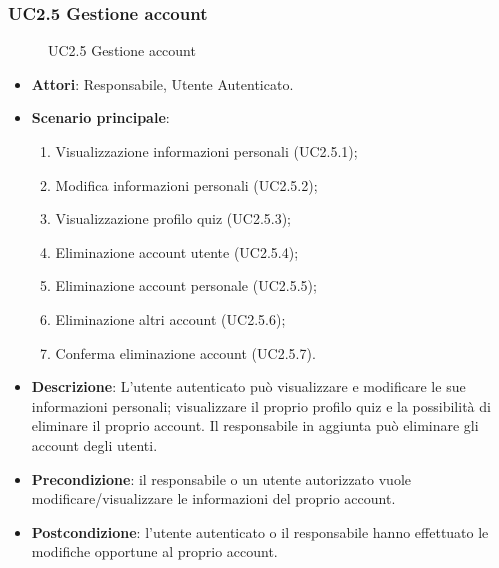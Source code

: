 \subsubsection{UC2.5 Gestione account}
\begin{figure}[H]
\centering
\noindent{}
\caption{UC2.5 Gestione account}
\end{figure}
\begin{itemize}
\item \textbf{Attori}: Responsabile, Utente Autenticato.
\item \textbf{Scenario principale}:
\begin{enumerate}
\item Visualizzazione informazioni personali (UC2.5.1);
\item Modifica informazioni personali (UC2.5.2);
\item Visualizzazione profilo quiz (UC2.5.3);
\item Eliminazione account utente (UC2.5.4);
\item Eliminazione account personale (UC2.5.5);
\item Eliminazione altri account (UC2.5.6);
\item Conferma eliminazione account (UC2.5.7).
\end{enumerate}
\item \textbf{Descrizione}: L'utente autenticato può visualizzare e modificare le sue informazioni personali; visualizzare il proprio profilo quiz e la possibilità di eliminare il proprio account. Il responsabile in aggiunta può eliminare gli account degli utenti.
\item \textbf{Precondizione}: il responsabile o un utente autorizzato vuole modificare/visualizzare le informazioni del proprio account.
\item \textbf{Postcondizione}: l'utente autenticato o il responsabile hanno effettuato le modifiche opportune al proprio account.
\end{itemize}
